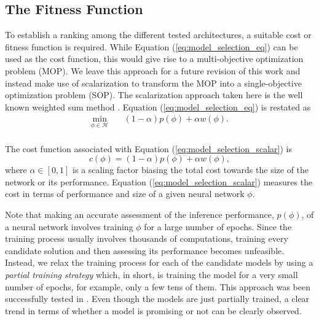 \documentclass[preprint,12pt]{elsarticle}%
\begin{document}
\subsection{The Fitness Function}
\label{sec:fitness_function}

To establish a ranking among the different tested architectures, a suitable cost or fitness function is required. While Equation (\ref{eq:model_selection_eq}) can be used as the cost function, this would give rise to a multi-objective optimization problem (MOP). We leave this approach for a future revision of this work and instead make use of scalarization to transform the MOP into a single-objective optimization problem (SOP). The scalarization approach taken here is the well known weighted sum method \cite{Hillermeier2001}. Equation (\ref{eq:model_selection_eq}) is restated as
\begin{equation}
\begin{aligned}
	\underset{\phi \in \mathcal{H}}{\text{min}}
	& \quad (1-\alpha)p(\phi) + \alpha w(\phi).\\
\end{aligned}
\label{eq:model_selection_scalar}
\end{equation}

The cost function associated with Equation (\ref{eq:model_selection_scalar}) is
\begin{equation}
c(\phi) = (1-\alpha)p(\phi) + \alpha w(\phi), 
\label{eq:fitness_function_scalar}
\end{equation}
where $\alpha \in \left[0,1\right]$ is a scaling factor biasing the total cost towards the size of the network or its performance. Equation (\ref{eq:model_selection_scalar}) measures the cost in terms of performance and size of a given neural network $\phi$.

Note that making an accurate assessment of the inference performance, $p(\phi)$, of a neural network involves training $\phi$ for a large number of epochs. Since the training process usually involves thousands of computations, training every candidate solution and then assessing its performance becomes unfeasible. Instead, we relax the training process for each of the candidate models by using a \textit{partial training strategy} which, in short, is training the model for a very small number of epochs, for example, only a few tens of them. This approach was been successfully tested in \cite{Laredo2019a}. Even though the models are just partially trained, a clear trend in terms of whether a model is promising or not can be clearly observed.
\end{document}
